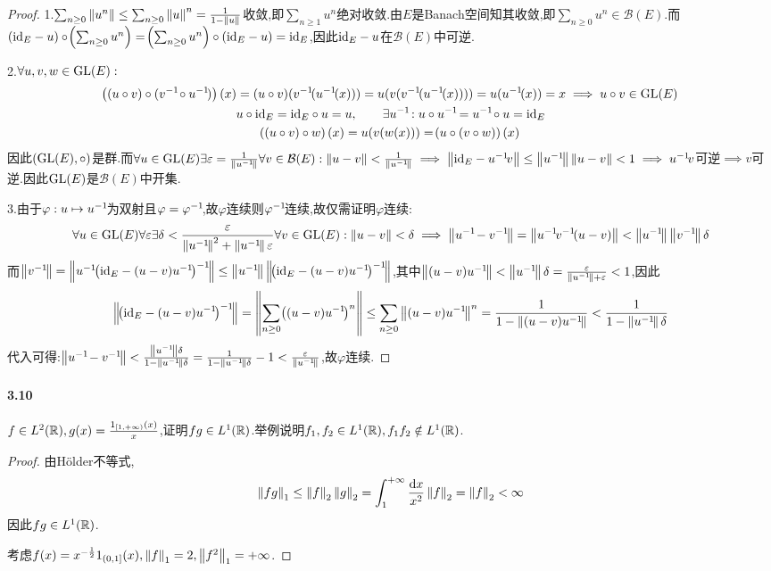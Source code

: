 \documentclass[UTF8]{article}
\begin{document}
\begin{proof}
    1.$\sum_{n\geq 0}\left\|u^n\right\|\leq \sum_{n\geq 0}\left\|u\right\|^n=\frac{1}{1-\left\|u\right\|}$收敛,即$\sum_{n\geq 1}u^n$绝对收敛.由$E$是Banach空间知其收敛,即$\sum_{n\geq 0}u^n\in \mathcal{B}(E)$.而$(\mathrm{id}_E-u)\circ\!\left(\sum_{n\geq 0}u^n\right)=\!\left(\sum_{n\geq 0}u^n\right)\circ(\mathrm{id}_E-u)=\mathrm{id}_E$,因此$\mathrm{id}_E-u$在$\mathcal{B}(E)$中可逆.

    2.$\forall u,v,w\in \operatorname{GL}(E):$$$\begin{gathered}
        \br{(u\circ v)\circ (v\rev \circ u\rev)}(x)=(u\circ v)(v\rev(u\rev(x)))=u(v(v\rev(u\rev(x))))=u(u\rev(x))=x\implies u\circ v\in \GL(E)\\
        u\circ \id_E=\id_E\circ u=u,\qquad \exists u\rev:u\circ u\rev=u\rev\circ u=\id_E\\
        \br{(u\circ v)\circ w}(x)=u(v(w(x)))=\br{u\circ (v\circ w)}(x)
    \end{gathered}$$
    因此$(\operatorname{GL}(E),\circ)$是群.而$\forall u\in \operatorname{GL}(E)\exists \varepsilon=\frac{1}{\left\|u^{-1}\!\right\|}\forall v\in \mathcal{B}(E):\left\|u-v\right\|<\frac{1}{\left\|u^{-1}\!\right\|}\implies \left\|\mathrm{id}_E-u^{-1}\! v\right\|\leq \left\|u^{-1}\!\right\|\left\|u-v\right\|<1\implies u^{-1}\! v$可逆$\implies v$可逆.因此$\operatorname{GL}(E)$是$\mathcal{B}(E)$中开集.

    3.由于$\varphi:u\mapsto u^{-1}\!$为双射且$\varphi=\varphi^{-1}\!$,故$\varphi$连续则$\varphi^{-1}\!$连续,故仅需证明$\varphi$连续:
    $$\forall u\in \GL(E)\forall \ve\exists \delta<\frac{\ve}{\norm{u\rev}^2+\norm{u\rev}\ve}\forall v\in \GL(E):\norm{u-v}<\delta\implies \norm{u\rev-v\rev}=\norm{u\rev v\rev (u-v)}<\norm{u\rev}\norm{v\rev}\delta$$
    而$\norm{v\rev}=\norm{u\rev\br{\id_E-(u-v)u\rev}\rev}\leq \norm{u\rev}\norm{\br{\id_E-(u-v)u\rev}\rev}$,其中$\left\|(u-v)u^{-1}\!\right\|<\left\|u^{-1}\!\right\|\delta=\frac{\varepsilon}{\left\|u^{-1}\!\right\|+\varepsilon}<1$,因此$$\norm{\br{\id_E-(u-v)u\rev}\rev}=\norm{\sum_{n\geq 0}\br{(u-v)u\rev}^n}\leq \sum_{n\geq 0}\norm{(u-v)u\rev}^n=\frac{1}{1-\norm{(u-v)u\rev}}<\frac{1}{1-\norm{u\rev}\delta}$$
    代入可得:$\left\|u^{-1}\!-v^{-1}\!\right\|<\frac{\left\|u^{-1}\!\right\|\delta}{1-\left\|u^{-1}\!\right\|\delta}=\frac{1}{1-\left\|u^{-1}\!\right\|\delta}-1<\frac{\varepsilon}{\left\|u^{-1}\!\right\|}$,故$\varphi$连续.
\end{proof}

\paragraph*{3.10}$f\in L^2(\mathbb{R}),g(x)=\frac{1_{\left[1,+\infty\right)}(x)}{x}$,证明$fg\in L^1(\mathbb{R})$.举例说明$f_1,f_2\in L^1(\mathbb{R}),f_1 f_2\notin L^1(\mathbb{R})$.

\begin{proof}
    由H\"{o}lder不等式,$$\left\|fg\right\|_1\leq \left\|f\right\|_2\left\|g\right\|_2=\int_1^{+\infty}\frac{\mathrm{d} x}{x^2}\left\|f\right\|_2=\left\|f\right\|_2<\infty$$
    因此$fg\in L^1(\mathbb{R})$.

    考虑$f(x)=x^{-\frac{1}{2}}1_{\left(0,1\right]}(x),\left\|f\right\|_1=2,\left\|f^2\right\|_1=+\infty$.
\end{proof}
\end{document}
